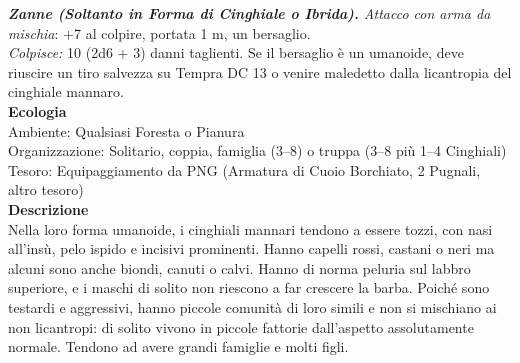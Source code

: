 \begin{multicols}{2}
\emph{\textbf{Zanne (Soltanto in Forma di Cinghiale o Ibrida).} Attacco con arma da mischia}: +7 al colpire, portata 1 m, un bersaglio.\\
\emph{Colpisce:} 10 (2d6 + 3) danni taglienti. Se il bersaglio è un umanoide, deve riuscire un tiro salvezza su Tempra DC  13 o venire maledetto dalla licantropia del cinghiale mannaro.\\
\textbf{Ecologia}\\
Ambiente: Qualsiasi Foresta o Pianura\\
Organizzazione: Solitario, coppia, famiglia (3–8) o truppa (3–8 più 1–4 Cinghiali)\\
Tesoro: Equipaggiamento da PNG (Armatura di Cuoio Borchiato, 2 Pugnali, altro tesoro)\\
\textbf{Descrizione}\\
Nella loro forma umanoide, i cinghiali mannari tendono a essere tozzi, con nasi all'insù, pelo ispido e incisivi prominenti. Hanno capelli rossi, castani o neri ma alcuni sono anche biondi, canuti o calvi. Hanno di norma peluria sul labbro superiore, e i maschi di solito non riescono a far crescere la barba. Poiché sono testardi e aggressivi, hanno piccole comunità di loro simili e non si mischiano ai non licantropi: di solito vivono in piccole fattorie dall'aspetto assolutamente normale. Tendono ad avere grandi famiglie e molti figli.\\


\end{multicols}
